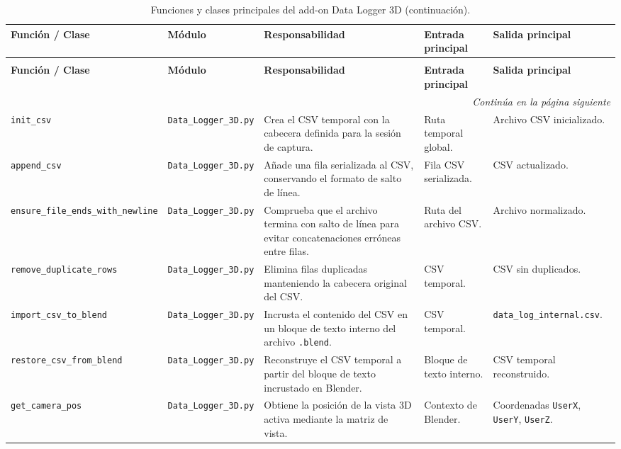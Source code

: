 \clearpage
{\pagestyle{empty}\thispagestyle{empty}
\begin{landscape}
\begingroup
\scriptsize
\setlength{\tabcolsep}{3pt}
\renewcommand{\arraystretch}{1.18}
\begin{longtable}{p{4.7cm}p{3.2cm}p{8.5cm}p{3.8cm}p{3.8cm}}
\caption{Funciones y clases principales del add-on Data Logger 3D.}\label{tab:d-funciones-logger}\\
\toprule
\textbf{Función / Clase} & \textbf{Módulo} & \textbf{Responsabilidad} & \textbf{Entrada principal} & \textbf{Salida principal} \\
\midrule
\endfirsthead
\caption[]{Funciones y clases principales del add-on Data Logger 3D (continuación).}\\
\toprule
\textbf{Función / Clase} & \textbf{Módulo} & \textbf{Responsabilidad} & \textbf{Entrada principal} & \textbf{Salida principal} \\
\midrule
\endhead
\midrule
\multicolumn{5}{r}{\textit{Continúa en la página siguiente}}\\
\endfoot
\bottomrule
\endlastfoot
\texttt{init\_csv} & \texttt{Data\_Logger\_3D.py} & Crea el CSV temporal con la cabecera definida para la sesión de captura. & Ruta temporal global. & Archivo CSV inicializado. \\
\texttt{append\_csv} & \texttt{Data\_Logger\_3D.py} & Añade una fila serializada al CSV, conservando el formato de salto de línea. & Fila CSV serializada. & CSV actualizado. \\
\texttt{ensure\_file\_ends\_with\_newline} & \texttt{Data\_Logger\_3D.py} & Comprueba que el archivo termina con salto de línea para evitar concatenaciones erróneas entre filas. & Ruta del archivo CSV. & Archivo normalizado. \\
\texttt{remove\_duplicate\_rows} & \texttt{Data\_Logger\_3D.py} & Elimina filas duplicadas manteniendo la cabecera original del CSV. & CSV temporal. & CSV sin duplicados. \\
\texttt{import\_csv\_to\_blend} & \texttt{Data\_Logger\_3D.py} & Incrusta el contenido del CSV en un bloque de texto interno del archivo \texttt{.blend}. & CSV temporal. & \texttt{data\_log\_internal.csv}. \\
\texttt{restore\_csv\_from\_blend} & \texttt{Data\_Logger\_3D.py} & Reconstruye el CSV temporal a partir del bloque de texto incrustado en Blender. & Bloque de texto interno. & CSV temporal reconstruido. \\
\texttt{get\_camera\_pos} & \texttt{Data\_Logger\_3D.py} & Obtiene la posición de la vista 3D activa mediante la matriz de vista. & Contexto de Blender. & Coordenadas \texttt{UserX}, \texttt{UserY}, \texttt{UserZ}. \\

\end{longtable}
\end{landscape}}

